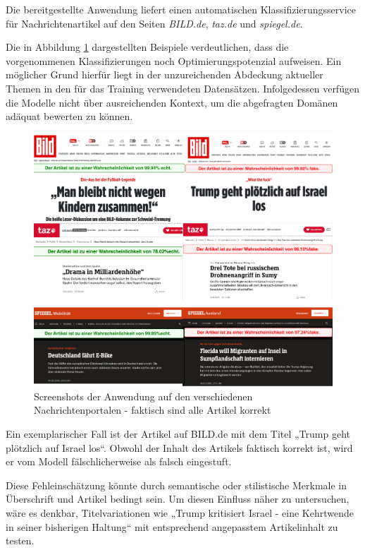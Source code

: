 Die bereitgestellte Anwendung liefert einen automatischen Klassifizierungsservice für Nachrichtenartikel auf den Seiten 
\textit{BILD.de}, \textit{taz.de} und \textit{spiegel.de}.

Die in Abbildung \ref{fig:screenshot_anwendung} dargestellten Beispiele verdeutlichen, dass die vorgenommenen Klassifizierungen noch Optimierungspotenzial aufweisen.
Ein möglicher Grund hierfür liegt in der unzureichenden Abdeckung aktueller Themen in den für das Training verwendeten Datensätzen. Infolgedessen verfügen die Modelle nicht 
über ausreichenden Kontext, um die abgefragten Domänen adäquat bewerten zu können.

\begin{figure}[htbp]
    \begin{center}
        \includegraphics[width=\linewidth]{static/screenshots_anwendung.png}
        \caption{\label{fig:screenshot_anwendung} Screenshots der Anwendung auf den verschiedenen Nachrichtenportalen - faktisch sind alle Artikel korrekt}
    \end{center}
\end{figure}

Ein exemplarischer Fall ist der Artikel auf BILD.de mit dem Titel „Trump geht plötzlich auf Israel los“. Obwohl der Inhalt des Artikels faktisch korrekt ist, 
wird er vom Modell fälschlicherweise als falsch eingestuft.

Diese Fehleinschätzung könnte durch semantische oder stilistische Merkmale in Überschrift und Artikel bedingt sein. Um diesen Einfluss näher zu untersuchen, wäre es denkbar, 
Titelvariationen wie „Trump kritisiert Israel - eine Kehrtwende in seiner bisherigen Haltung“ mit entsprechend angepasstem Artikelinhalt zu testen.
